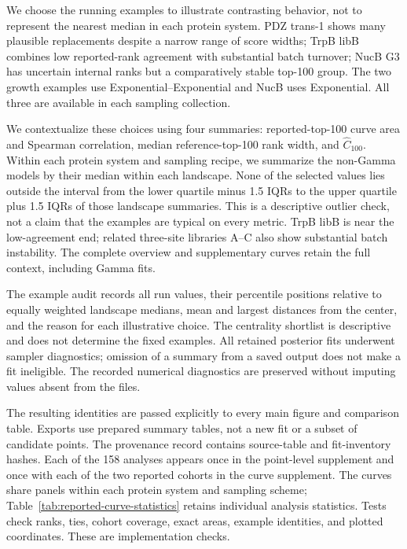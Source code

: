 We choose the running examples to illustrate contrasting behavior,
not to represent the nearest median in each protein system. PDZ trans-1
shows many plausible replacements despite a narrow range of score widths;
TrpB libB combines low reported-rank agreement with substantial batch
turnover; NucB G3 has uncertain internal ranks but a comparatively stable
top-100 group. The two growth examples use Exponential--Exponential and
NucB uses Exponential. All three are available in each sampling collection.

We contextualize these choices using four summaries: reported-top-100
curve area and Spearman correlation, median reference-top-100 rank width,
and $\widehat C_{100}$. Within each protein system and sampling recipe,
we summarize the non-Gamma models by their median within each landscape.
None of the selected values lies outside the interval from the lower
quartile minus 1.5 IQRs to the upper quartile plus 1.5 IQRs of those
landscape summaries. This is a descriptive outlier check, not a claim
that the examples are typical on every metric. TrpB libB is near the
low-agreement end; related three-site libraries A--C also show substantial
batch instability. The complete overview and supplementary curves retain
the full context, including Gamma fits.

The example audit records all run values, their percentile positions
relative to equally weighted landscape medians, mean and largest distances
from the center, and the reason for each illustrative choice. The centrality
shortlist is descriptive and does not determine the fixed examples.
All retained posterior fits underwent sampler diagnostics; omission of a summary
from a saved output does not make a fit ineligible. The recorded numerical
diagnostics are preserved without imputing values absent from the files.

The resulting identities are passed explicitly to every main
figure and comparison table. Exports use prepared summary tables,
not a new fit or a subset of candidate points. The provenance
record contains source-table and fit-inventory hashes. Each of
the 158 analyses appears once in the point-level supplement and
once with each of the two reported cohorts in the curve supplement.
The curves share panels within each protein system and sampling scheme;
Table~\ref{tab:reported-curve-statistics} retains individual analysis
statistics. Tests check ranks, ties, cohort coverage, exact areas, example
identities, and plotted coordinates. These are implementation checks.